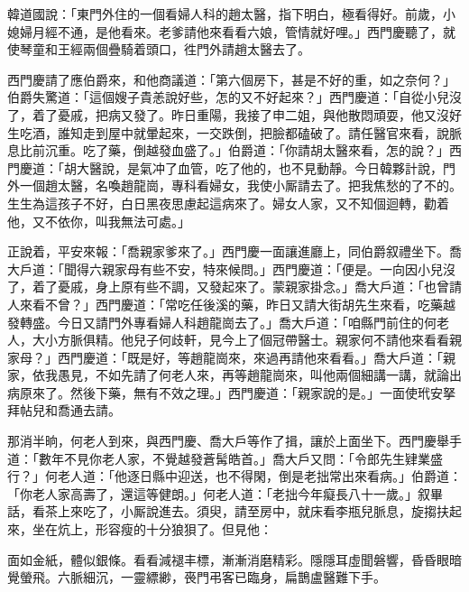 韓道國說：「東門外住的一個看婦人科的趙太醫，指下明白，極看得好。前歲，小媳婦月經不通，{}是他看來。老爹請他來看看六娘，管情就好哩。」西門慶聽了，就使琴童和王經兩個疊騎着頭口，徃門外請趙太醫去了。

西門慶請了應伯爵來，和他商議道：「第六個房下，甚是不好的重，如之奈何？」伯爵失驚道：「這個嫂子貴恙說好些，怎的又不好起來？」西門慶道：「自從小兒沒了，着了憂戚，把病又發了。昨日重陽，我接了申二姐，與他散悶頑耍，他又沒好生吃酒，誰知走到屋中就暈起來，一交跌倒，把臉都磕破了。請任醫官來看，說脈息比前沉重。吃了藥，倒越發血盛了。」伯爵道：「你請胡太醫來看，怎的說？」西門慶道：「胡大醫說，是氣冲了血管，吃了他的，也不見動靜。今日韓夥計說，門外一個趙太醫，名喚趙龍崗，專科看婦女，我使小厮請去了。把我焦愁的了不的。生生為這孩子不好，白日黑夜思慮起這病來了。婦女人家，又不知個迴轉，勸着他，又不依你，叫我無法可處。」{}

正說着，平安來報：「喬親家爹來了。」西門慶一面讓進廳上，同伯爵叙禮坐下。喬大戶道：「聞得六親家母有些不安，特來候問。」西門慶道：「便是。一向因小兒沒了，着了憂戚，身上原有些不調，又發起來了。蒙親家掛念。」喬大戶道：「也曾請人來看不曾？」西門慶道：「常吃任後溪的藥，昨日又請大街胡先生來看，吃藥越發轉盛。今日又請門外專看婦人科趙龍崗去了。」喬大戶道：「咱縣門前住的何老人，大小方脈俱精。他兒子何歧軒，見今上了個冠帶醫士。親家何不請他來看看親家母？」西門慶道：「既是好，等趙龍崗來，來過再請他來看看。」喬大戶道：「親家，依我愚見，不如先請了何老人來，再等趙龍崗來，叫他兩個細講一講，就論出病原來了。{}然後下藥，無有不效之理。」西門慶道：「親家說的是。」一面使玳安拏拜帖兒和喬通去請。

那消半晌，何老人到來，與西門慶、喬大戶等作了揖，讓於上面坐下。西門慶舉手道：「數年不見你老人家，不覺越發蒼髯皓首。」喬大戶又問：「令郎先生肄業盛行？」何老人道：「他逐日縣中迎送，也不得閑，倒是老拙常出來看病。」伯爵道：「你老人家高壽了，還這等健朗。」何老人道：「老拙今年癡長八十一歲。」叙畢話，看茶上來吃了，小厮說進去。須臾，請至房中，就床看李瓶兒脈息，旋搊扶起來，坐在炕上，形容瘦的十分狼狽了。但見他：

\begin{myquote}
面如金紙，體似銀條。看看減褪丰標，漸漸消磨精彩。隱隱耳虛聞磐響，昏昏眼暗覺螢飛。六脈細沉，一靈縹緲，䘮門弔客已臨身，扁鵲盧醫難下手。
\end{myquote}

